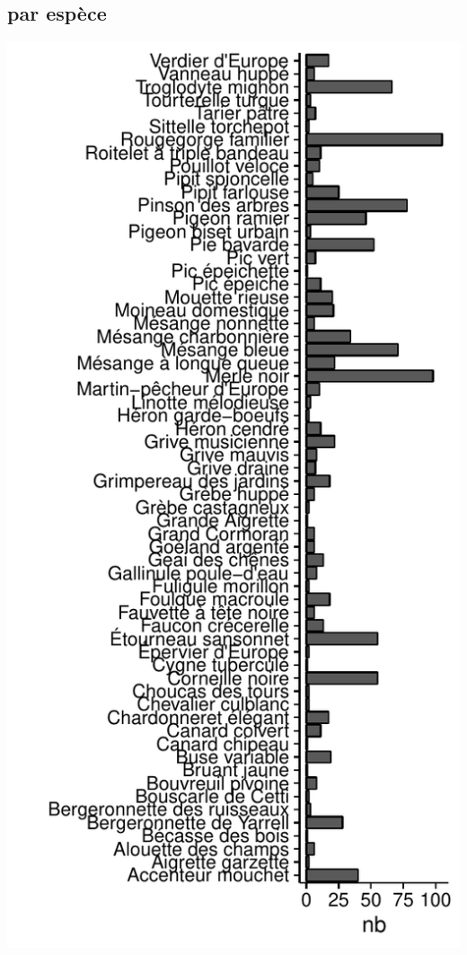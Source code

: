 \subsection{par espèce}
\includegraphics[width=\malargeurgraphique]{images/serena_stat_champ_espece.pdf}
